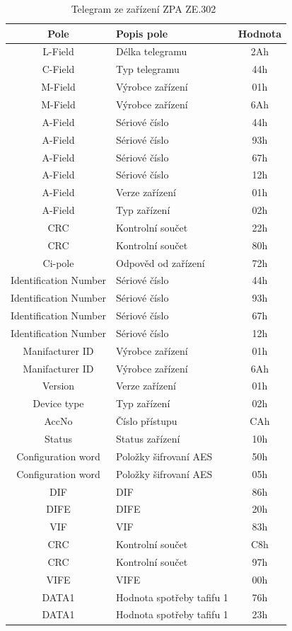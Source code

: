 \begin{table}[!ht]
\centering
\caption{Telegram ze zařízení ZPA ZE.302~\cite{CidloZpa}}
\label{TabulkaTelegramZPA}
\begin{tabular}{|c|l|c|}
\hline
\textbf{Pole}      & \textbf{Popis pole}            & \textbf{Hodnota} \\ \hline \hline
L-Field & Délka telegramu & 2Ah \\ \hline
C-Field & Typ telegramu & 44h \\ \hline
M-Field & Výrobce zařízení & 01h \\ \hline
M-Field & Výrobce zařízení & 6Ah \\ \hline
A-Field & Sériové číslo & 44h \\ \hline
A-Field & Sériové číslo & 93h \\ \hline
A-Field & Sériové číslo & 67h \\ \hline
A-Field & Sériové číslo & 12h \\ \hline
A-Field & Verze zařízení & 01h \\ \hline
A-Field & Typ zařízení & 02h \\ \hline
CRC & Kontrolní součet & 22h \\ \hline
CRC & Kontrolní součet & 80h \\ \hline
Ci-pole & Odpověd od zařízení & 72h \\ \hline
Identification Number & Sériové číslo & 44h \\ \hline
Identification Number & Sériové číslo & 93h \\ \hline
Identification Number & Sériové číslo & 67h \\ \hline
Identification Number & Sériové číslo & 12h \\ \hline
Manifacturer ID & Výrobce zařízení & 01h \\ \hline
Manifacturer ID & Výrobce zařízení & 6Ah \\ \hline
Version & Verze zařízení & 01h \\ \hline
Device type & Typ zařízení & 02h \\ \hline
AccNo & Číslo přístupu & CAh \\ \hline
Status & Status zařízení & 10h \\ \hline
Configuration word & Položky šifrovaní AES & 50h \\ \hline
Configuration word & Položky šifrovaní AES & 05h \\ \hline
DIF & DIF & 86h \\ \hline
DIFE & DIFE & 20h \\ \hline
VIF & VIF & 83h \\ \hline
CRC & Kontrolní součet & C8h \\ \hline
CRC & Kontrolní součet & 97h \\ \hline
VIFE & VIFE & 00h \\ \hline
DATA1 & Hodnota spotřeby tafifu 1 & 76h \\ \hline
DATA1 & Hodnota spotřeby tafifu 1 & 23h \\ \hline
\end{tabular}
\end{table}

